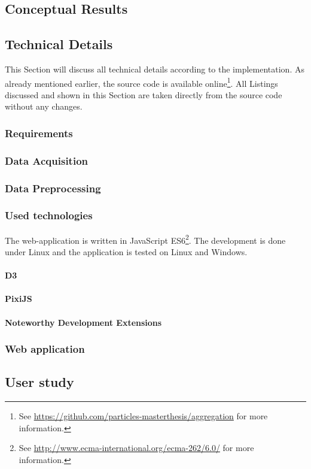 \subsection{Conceptual Results}


\subsection{Technical Details}
This Section will discuss all technical details according to the implementation.
As already mentioned earlier, the source code is available online\footnote{See \href{https://github.com/particles-masterthesis/aggregation}{https://github.com/particles-masterthesis/aggregation} for more information.}. All Listings discussed and shown in this Section are taken directly from the source code without any changes.

\subsubsection{Requirements}


\subsubsection{Data Acquisition}
\label{s:data-acquisition}


\subsubsection{Data Preprocessing}
\label{s:data-preprocessing}


\subsubsection{Used technologies}
The web-application is written in JavaScript ES6\footnote{See \href{http://www.ecma-international.org/ecma-262/6.0/}{http://www.ecma-international.org/ecma-262/6.0/} for more information.}. The development is done under Linux and the application is tested on Linux and Windows.

\paragraph{D3}


\paragraph{PixiJS}


\paragraph{Noteworthy Development Extensions}


\subsubsection{Web application}
\label{s:web-application}


\subsection{User study}

